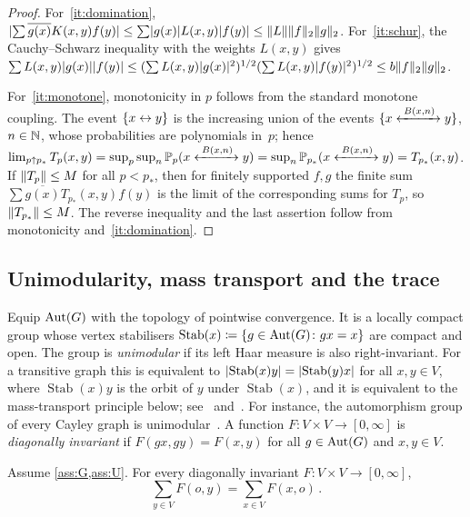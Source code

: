 \begin{proof}
For~\ref{it:domination}, $\lvert\sum\overline{g(x)}K(x,y)f(y)\rvert\le\sum\lvert g(x)\rvert L(x,y)\lvert f(y)\rvert
\le\lVert L\rVert\lVert f\rVert_2\lVert g\rVert_2$. For~\ref{it:schur}, the Cauchy--Schwarz inequality with the weights
$L(x,y)$ gives
$\sum L(x,y)\lvert g(x)\rvert\lvert f(y)\rvert\le(\sum L(x,y)\lvert g(x)\rvert^2)^{1/2}(\sum L(x,y)\lvert f(y)\rvert^2)^{1/2}
\le b\lVert f\rVert_2\lVert g\rVert_2$.

For~\ref{it:monotone}, monotonicity in $p$ follows from the standard monotone coupling. The event
$\{x\leftrightarrow y\}$ is the increasing union of the events $\{x\xleftrightarrow{\;B(x,n)\;}y\}$, $n\in\mathbb N$, whose
probabilities are polynomials in~$p$; hence $\lim_{p\uparrow p_*}T_p(x,y)=\sup_p\sup_n
\mathbb P_p(x\xleftrightarrow{\;B(x,n)\;}y)=\sup_n\mathbb P_{p_*}(x\xleftrightarrow{\;B(x,n)\;}y)=T_{p_*}(x,y)$. If
$\lVert T_p\rVert\le M$ for all $p<p_*$, then for finitely supported $f,g$ the finite sum
$\sum\overline{g(x)}T_{p_*}(x,y)f(y)$ is the limit of the corresponding sums for $T_p$, so
$\lVert T_{p_*}\rVert\le M$. The reverse inequality and the last assertion follow from monotonicity
and~\ref{it:domination}.
\end{proof}

\subsection{Unimodularity, mass transport and the trace}\label{sec:mtp}

Equip $\operatorname{Aut}(G)$ with the topology of pointwise convergence. It is a locally compact group whose vertex
stabilisers $\operatorname{Stab}(x)\coloneqq\{g\in\operatorname{Aut}(G)\colon gx=x\}$ are compact and open. The group
is \emph{unimodular} if its left Haar measure is also right-invariant. For a transitive graph this is
equivalent to $\lvert\operatorname{Stab}(x)y\rvert=\lvert\operatorname{Stab}(y)x\rvert$ for all $x,y\in V$, where
$\operatorname{Stab}(x)y$ is the orbit of $y$ under $\operatorname{Stab}(x)$, and it is equivalent to the mass-transport
principle below; see~\cite[Section~3]{BLPS99b} and~\cite[Chapter~8]{LP16}. For instance, the
automorphism group of every Cayley graph is unimodular~\cite[Chapter~8]{LP16}. A function
$F\colon V\times V\to[0,\infty]$ is \emph{diagonally invariant} if $F(gx,gy)=F(x,y)$ for all
$g\in\operatorname{Aut}(G)$ and $x,y\in V$.

\begin{lemma}\label{lem:mtp}
Assume \cref{ass:G,ass:U}. For every diagonally invariant $F\colon V\times V\to[0,\infty]$,
\begin{equation*}
  \sum_{y\in V}F(o,y)=\sum_{x\in V}F(x,o)\,.
\end{equation*}
\end{lemma}

